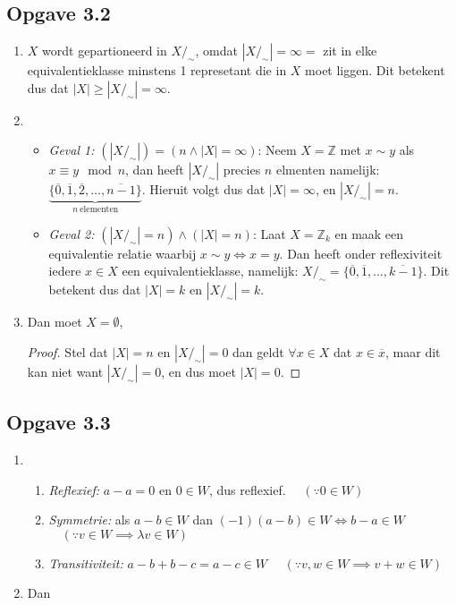 \documentclass{article}
\newcommand{\Z}{\mathbb{Z}}
\newcommand{\q}{/_\sim}
\newcommand{\ol}[1]{\overline{#1}}
\begin{document}
\subsection*{Opgave 3.2}
\begin{enumerate}[label=\alph*)]
	\item $X$ wordt gepartioneerd in $X/_\sim$, omdat $|X/_\sim| = \infty =$ zit in elke equivalentieklasse minstens 1 represetant die in $X$ moet liggen. Dit betekent dus dat $|X| \geq |X/_\sim| = \infty$.
	\item
	      \begin{itemize}
		      \item \emph{Geval 1:} $(|X/_\sim|) = (n \wedge |X| = \infty)$:
		            Neem $X=\Z$ met $x \sim y$ als $x \equiv y \mod n$, dan
		            heeft $|X\q|$ precies $n$ elmenten namelijk: $\underbrace{\{ \ol{0}, \ol{1}, \ol{2}, \dots ,\ol{n-1} \}}_{n\ \text{elementen}}$.
		            Hieruit volgt dus dat $|X| = \infty$, en $|X\q| = n$.
		      \item \emph{Geval 2:} $(|X\q|  = n) \wedge (|X| = n)$:
		            Laat $X = \Z_{k}$ en maak een equivalentie relatie waarbij $x \sim y \Longleftrightarrow x = y$.
		            Dan heeft onder reflexiviteit iedere $x \in X$ een equivalentieklasse,
		            namelijk: $X\q = \{\ol{0}, \ol{1}, \dots , \ol{k-1} \}$.
		            Dit betekent dus dat $|X| = k$ en $|X\q| = k$.
	      \end{itemize}
	\item
	      Dan moet $X = \emptyset$,
	      \begin{proof}
		      Stel dat $|X| = n$ en $|X\q| = 0$ dan geldt $\forall x \in
			      X$ dat $x \in \ol{x}$,
		      maar dit kan niet want $|X\q| = 0$, en dus
		      moet $|X| = 0$.
	      \end{proof}
\end{enumerate}
\subsection*{Opgave 3.3}
\begin{enumerate}[label=\alph*)]
	\item
	      \begin{enumerate}[label=\arabic*]
		      \item \emph{Reflexief:} $a-a = 0$ en $0 \in W$,
		            dus reflexief.
		            $\quad (\because 0 \in W)$
		      \item \emph{Symmetrie:} als $a-b \in W$
		            dan $(-1)(a - b) \in W
			            \Longleftrightarrow b - a\in W $
		            $\quad (\because v \in W \implies \lambda v \in W)$
		      \item \emph{Transitiviteit:} $a - b + b - c  =
			            a - c \in W$
		            $\quad (\because v, w \in W \implies v + w \in W)$
	      \end{enumerate}
	\item
	      Dan
\end{enumerate}
\end{document}
